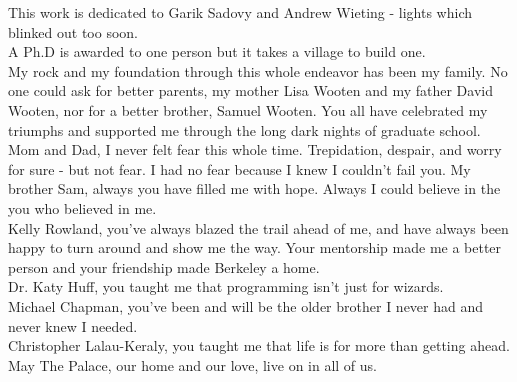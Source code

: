 \documentclass{ucbthesis}
\begin{document}
\begin{frontmatter}


\setcounter{secnumdepth}{3}
\setcounter{tocdepth}{3}


\tableofcontents
\clearpage
\listoffigures
\clearpage

\begin{acknowledgements}
This work is dedicated to Garik Sadovy and Andrew Wieting - lights which blinked
out too soon.\\

\noindent A Ph.D is awarded to one person but it takes a village to build one.\\

\noindent My rock and my foundation through this whole endeavor has been my 
family. 
No one could ask for better parents, my mother Lisa Wooten and my father David
Wooten, nor for a better brother, Samuel Wooten. You all have celebrated my
triumphs and supported me through the long dark nights of graduate school. Mom
and Dad, I never felt fear this whole time. Trepidation, despair, and worry for
sure - but not fear. I had no fear because I knew I couldn't fail you. My
brother Sam, always you have filled me with hope. Always I could believe in the
you who believed in me.\\

\noindent Kelly Rowland, you've always blazed the trail ahead of me, and have
always been happy to turn around and show me the way. Your mentorship made me
a better person and your friendship made Berkeley a home.\\

\noindent Dr. Katy Huff, you taught me that programming isn't 
just for wizards.\\

\noindent Michael Chapman, you've been and will be the older brother I never had
and never knew I needed.\\

\noindent Christopher Lalau-Keraly, you taught me that life is for more than
getting ahead.\\

\noindent May The Palace, our home and our love, live on in all of us. \\


\end{acknowledgements}
\end{frontmatter}
\end{document}
